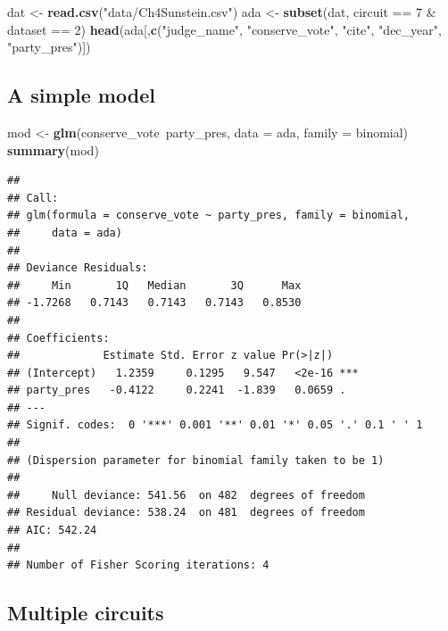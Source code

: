 \documentclass[12pt,twoside]{article}
\newenvironment{Shaded}{}{}
\newcommand{\KeywordTok}[1]{\textcolor[rgb]{0.00,0.44,0.13}{\textbf{{#1}}}}
\newcommand{\DataTypeTok}[1]{\textcolor[rgb]{0.56,0.13,0.00}{{#1}}}
\newcommand{\DecValTok}[1]{\textcolor[rgb]{0.25,0.63,0.44}{{#1}}}
\newcommand{\StringTok}[1]{\textcolor[rgb]{0.25,0.44,0.63}{{#1}}}
\newcommand{\NormalTok}[1]{{#1}}
\begin{document}
\begin{Shaded}
\begin{Highlighting}[]
\NormalTok{dat <-}\StringTok{ }\KeywordTok{read.csv}\NormalTok{(}\StringTok{"data/Ch4Sunstein.csv"}\NormalTok{)}
\NormalTok{ada <-}\StringTok{ }\KeywordTok{subset}\NormalTok{(dat, circuit ==}\StringTok{ }\DecValTok{7} \NormalTok{&}\StringTok{ }\NormalTok{dataset ==}\StringTok{ }\DecValTok{2}\NormalTok{)}
\KeywordTok{head}\NormalTok{(ada[,}\KeywordTok{c}\NormalTok{(}\StringTok{"judge_name"}\NormalTok{, }\StringTok{"conserve_vote"}\NormalTok{, }\StringTok{"cite"}\NormalTok{, }\StringTok{"dec_year"}\NormalTok{, }\StringTok{"party_pres"}\NormalTok{)])}
\end{Highlighting}
\end{Shaded}

\subsection{A simple model}\label{a-simple-model}

\footnotesize

\begin{Shaded}
\begin{Highlighting}[]
\NormalTok{mod <-}\StringTok{ }\KeywordTok{glm}\NormalTok{(conserve_vote~party_pres,}
           \DataTypeTok{data =} \NormalTok{ada,}
           \DataTypeTok{family =} \NormalTok{binomial)}
\KeywordTok{summary}\NormalTok{(mod)}
\end{Highlighting}
\end{Shaded}

\begin{verbatim}
## 
## Call:
## glm(formula = conserve_vote ~ party_pres, family = binomial, 
##     data = ada)
## 
## Deviance Residuals: 
##     Min       1Q   Median       3Q      Max  
## -1.7268   0.7143   0.7143   0.7143   0.8530  
## 
## Coefficients:
##             Estimate Std. Error z value Pr(>|z|)    
## (Intercept)   1.2359     0.1295   9.547   <2e-16 ***
## party_pres   -0.4122     0.2241  -1.839   0.0659 .  
## ---
## Signif. codes:  0 '***' 0.001 '**' 0.01 '*' 0.05 '.' 0.1 ' ' 1
## 
## (Dispersion parameter for binomial family taken to be 1)
## 
##     Null deviance: 541.56  on 482  degrees of freedom
## Residual deviance: 538.24  on 481  degrees of freedom
## AIC: 542.24
## 
## Number of Fisher Scoring iterations: 4
\end{verbatim}

\subsection{Multiple circuits}\label{multiple-circuits}
\end{document}

